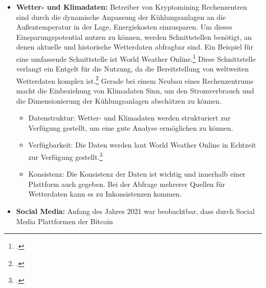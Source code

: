 \begin{itemize}
    zwischen \ac{BTC} und \ac{USD}. Zum anderen müssen die Handelsgebühren einer Tauschbörse noch zusätzlich in Betracht
    gezogen werden. Alle diese Werte unterscheiden sich von Börse zu Börse. Tauschbörsen haben umfangreiche und
    performante \acp{API}, um mit diesen sehr schnell handeln zu können.
    \begin{itemize}
        \item Datenstruktur: Tauschbörsen bieten strukturierte Daten an. Nur diese Form der Daten lässt eine sehr schnelle
        Bearbeitung und Analyse zu.\footcite[Cf.][p. 27]{kimble2015big}
        \item Verfügbarkeit: Die Schnittstellen der Börse stellen Daten in Echtzeit bereit.
        \item Konsistenz: Die Daten der Tauschbörsen müssen konsistent sein, da sonst Probleme im Handel auftreten können.
    \end{itemize}
    \item \textbf{Wetter- und Klimadaten: }Betreiber von Kryptomining Rechenzentren sind durch die dynamische Anpassung der
    Kühlungsanlagen an die Außentemperatur in der Lage, Energiekosten einzusparen. Um dieses Einsparungspotential nutzen zu
    können, werden Schnittstellen benötigt, an denen aktuelle und historische Wetterdaten abfragbar sind. Ein Beispiel für
    eine umfassende Schnittstelle ist World Weather Online.\footcite[Cf.][]{wwo2021api} Diese Schnittstelle verlangt ein Entgelt
    für die Nutzung, da die Bereitstellung von weltweiten Wetterdaten komplex ist.\footcite[Cf.][]{wwo2021pricing} Gerade bei
    einem Neubau eines Rechenzentrums macht die Einbeziehung von Klimadaten Sinn, um den Stromverbrauch und die Dimensionierung
    der Kühlungsanlagen abschätzen zu können.
    \begin{itemize}
        \item Datenstruktur: Wetter- und Klimadaten werden strukturiert zur Verfügung gestellt, um eine gute Analyse ermöglichen
        zu können.
        \item Verfügbarkeit: Die Daten werden laut World Weather Online in Echtzeit zur Verfügung
        gestellt.\footcite[Cf.][]{wwo2021api}
        \item Konsistenz: Die Konsistenz der Daten ist wichtig und innerhalb einer Plattform auch gegeben. Bei der Abfrage
        mehrerer Quellen für Wetterdaten kann es zu Inkonsistenzen kommen.
    \end{itemize}
    \item \textbf{Social Media: }Anfang des Jahres 2021 war beobachtbar, dass durch Social Media Plattformen der Bitcoin

\end{itemize}
